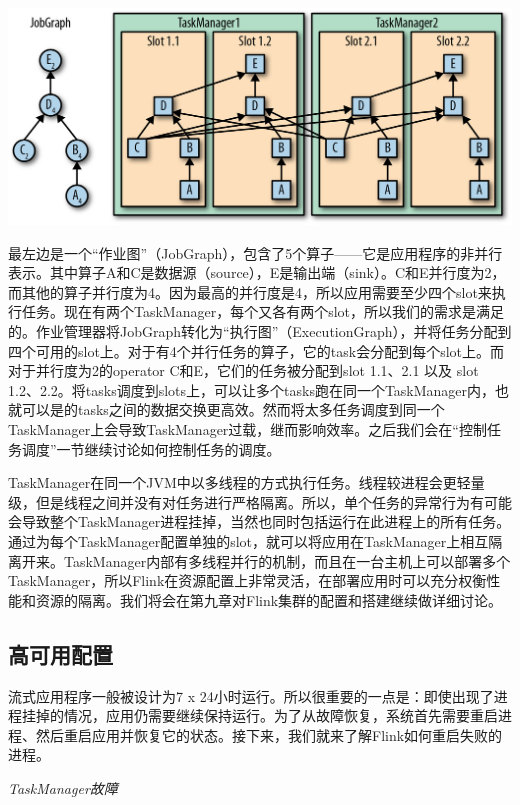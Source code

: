 \documentclass[cn,11pt,chinese]{elegantbook}
\begin{document}
\includegraphics{images/spaf_0302.png}

最左边是一个``作业图''（JobGraph），包含了5个算子------它是应用程序的非并行表示。其中算子A和C是数据源（source），E是输出端（sink）。C和E并行度为2，而其他的算子并行度为4。因为最高的并行度是4，所以应用需要至少四个slot来执行任务。现在有两个TaskManager，每个又各有两个slot，所以我们的需求是满足的。作业管理器将JobGraph转化为``执行图''（ExecutionGraph），并将任务分配到四个可用的slot上。对于有4个并行任务的算子，它的task会分配到每个slot上。而对于并行度为2的operator
C和E，它们的任务被分配到slot 1.1、2.1 以及 slot
1.2、2.2。将tasks调度到slots上，可以让多个tasks跑在同一个TaskManager内，也就可以是的tasks之间的数据交换更高效。然而将太多任务调度到同一个TaskManager上会导致TaskManager过载，继而影响效率。之后我们会在``控制任务调度''一节继续讨论如何控制任务的调度。

TaskManager在同一个JVM中以多线程的方式执行任务。线程较进程会更轻量级，但是线程之间并没有对任务进行严格隔离。所以，单个任务的异常行为有可能会导致整个TaskManager进程挂掉，当然也同时包括运行在此进程上的所有任务。通过为每个TaskManager配置单独的slot，就可以将应用在TaskManager上相互隔离开来。TaskManager内部有多线程并行的机制，而且在一台主机上可以部署多个TaskManager，所以Flink在资源配置上非常灵活，在部署应用时可以充分权衡性能和资源的隔离。我们将会在第九章对Flink集群的配置和搭建继续做详细讨论。

\hypertarget{ux9ad8ux53efux7528ux914dux7f6e}{%
\subsection{高可用配置}\label{ux9ad8ux53efux7528ux914dux7f6e}}

流式应用程序一般被设计为7 x
24小时运行。所以很重要的一点是：即使出现了进程挂掉的情况，应用仍需要继续保持运行。为了从故障恢复，系统首先需要重启进程、然后重启应用并恢复它的状态。接下来，我们就来了解Flink如何重启失败的进程。

\emph{TaskManager故障}
\end{document}
